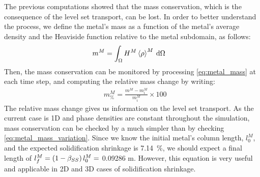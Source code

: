 The previous computations showed that the mass conservation, which is the consequence of the level set transport,
can be lost. In order to better understand the process, we define the metal's mass as a function of the 
metal's average density and the Heaviside function relative to the metal subdomain, as follows:
\begin{align}
\label{eq:metal_mass}
& m^M = \int_{\Omega} H^M \left \langle \rho \right \rangle^M\: \mathrm{d}\Omega	
\end{align}
Then, the mass conservation can be monitored by processing \cref{eq:metal_mass} at each time step, and computing
the relative mass change by writing:
\begin{align}
\label{eq:metal_mass_variation}
&  m^M_\% = \frac{m^M - m^M_i}{m^M_i} \times 100	
\end{align}
The relative mass change gives us information on the level set transport.
As the current case is 1D and phase densities are constant throughout the simulation, mass conservation can be 
checked by a much simpler than by checking \cref{eq:metal_mass_variation}. Since we know the initial metal's column
length, $l^M_0$, and the expected solidification shrinkage is \SI{7.14}{\percent}, we should expect a final length of 
$l^M_f= \left( 1-\beta_{SS} \right) l^M_0 =$  0.09286 \si{\metre}. However, this equation is very useful and applicable in 2D and 3D
cases of solidification shrinkage.
